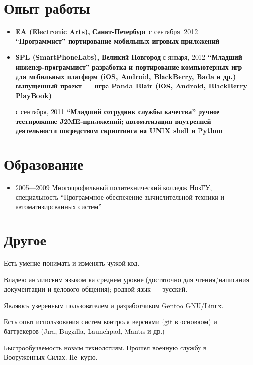 \section{Опыт работы}
\begin{itemize}
\item {
\fontsize{14pt}{14pt}\selectfont
\bfseries EA (Electronic Arts)\mdseries, Санкт-Петербург
}
\subitem с сентября, 2012 \bfseries ``Программист''\mdseries
\subsubitem портирование мобильных игровых приложений
\subitem

\item {
\fontsize{14pt}{14pt}\selectfont
\bfseries SPL (SmartPhoneLabs)\mdseries, Великий Новгород
}
\subitem с января, 2012 \bfseries ``Младший инженер-программист''\mdseries
\subsubitem разработка и портирование компьютерных игр для мобильных платформ
(iOS, Android, BlackBerry, Bada и др.)
\subsubitem выпущенный проект --- игра Panda Blair (iOS, Android, BlackBerry PlayBook)

\subitem
\subitem с сентября, 2011 \bfseries ``Младший сотрудник службы качества''\mdseries
\subsubitem ручное тестирование J2ME-приложений;
\subsubitem автоматизация внутренней деятельности посредством скриптинга на UNIX shell
и Python
\end{itemize}

\section{Образование}
\begin{itemize}
\item 2005---2009 Многопрофильный политехнический колледж НовГУ, специальность
``Программное обеспечение вычислительной техники и автоматизированных систем''
\end{itemize}

\section{Другое}
Есть умение понимать и изменять чужой код.

Владею английским языком на среднем уровне (достаточно для чтения/написания
документации и делового общения); родной язык --- русский.

Являюсь уверенным пользователем и разработчиком Gentoo GNU/Linux.

Есть опыт использования систем контроля версиями (git в основном) и
багтрекеров (Jira, Bugzilla, Launchpad, Mantis и др.)

Быстрообучаемость новым технологиям.
Прошел военную службу в Вооруженных Силах.
Не~курю.
